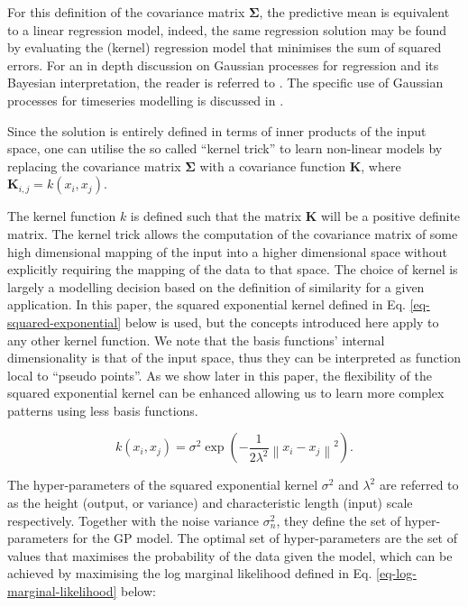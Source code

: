 \documentclass[useAMS,usenatbib,fleqn]{mn2e}
\newcommand{\bm}[1]{\mathbf{#1} }
\begin{document}
For this definition of the covariance matrix $\bm{\Sigma}$, the predictive mean is equivalent to a linear regression model, indeed, the same regression solution may be found by evaluating the (kernel) regression model that minimises the sum of squared errors. For an in depth discussion on Gaussian processes for regression and its Bayesian interpretation, the reader is referred to \citep{rasmussen2006gaussian}. The specific use of Gaussian processes for timeseries modelling is discussed in \citep{roberts2012rs}.

Since the solution is entirely defined in terms of inner products of the input space, one can utilise the so called ``kernel trick'' to learn non-linear models by replacing the covariance matrix $\bm{\Sigma}$ with a covariance function $\bm{K}$, where $\bm{K}_{i,j} = k(x_{i},x_{j})$.

The kernel function $k$ is defined such that the matrix $\bm{K}$ will be a positive definite matrix. The kernel trick allows the computation of the covariance matrix of some high dimensional mapping of the input into a higher dimensional space without explicitly requiring the mapping of the data to that space. The choice of kernel is largely a modelling decision based on the definition of similarity for a given application. In this paper, the squared exponential kernel defined in  Eq. \eqref{eq-squared-exponential} below is used, but the concepts introduced here apply to any other kernel function. We note that the basis functions' internal dimensionality is that of the input space, thus they can be interpreted as function local to ``pseudo points''. As we show later in this paper, the flexibility of the squared exponential kernel can be enhanced allowing us to learn more complex patterns using less basis functions.

\begin{equation}
\label{eq-squared-exponential}
k(x_{i},x_{j}) = \sigma^{2} \exp \left ( -\frac{1} {2\lambda^{2}} \left \|x_{i}-x_{j}\right\|^{2}\right ).
\end{equation}

The hyper-parameters of the squared exponential kernel $\sigma^{2}$ and $\lambda^{2}$ are referred to as the height (output, or variance) and characteristic length (input) scale respectively. Together with the noise variance $\sigma_{n}^{2}$, they define the set of hyper-parameters for the GP model. The optimal set of hyper-parameters are the set of values that maximises the probability of the data given the model, which can be achieved by maximising the log marginal likelihood defined in Eq. \eqref{eq-log-marginal-likelihood} below:
\end{document}
